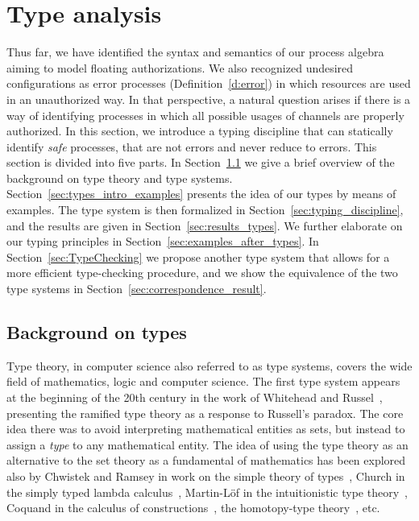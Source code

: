 
\section{Type analysis}\label{sec:Types}

Thus far, we have identified the syntax and semantics of our process algebra aiming to model floating authorizations. We also recognized undesired configurations as error processes (Definition~\ref{d:error})  in which resources are used in an unauthorized way. In that perspective, a natural question arises if there is a way of identifying processes in which all possible usages of channels are properly authorized. 
In this section, we introduce a typing discipline that can statically identify \emph{safe} processes, that are not errors and never reduce to errors. 
This section is divided into five parts. In Section~\ref{sec:types_background} we give a brief overview of the background on type theory and type systems. Section~\ref{sec:types_intro_examples} presents the idea of our types by means of examples. The type system is then formalized in Section~\ref{sec:typing_discipline}, and the results are given in Section~\ref{sec:results_types}. We further elaborate on our typing principles in Section~\ref{sec:examples_after_types}. In Section~\ref{sec:TypeChecking} we propose another type system that allows for a more efficient type-checking procedure, and we show the equivalence of the two type systems in Section~\ref{sec:correspondence_result}.

\subsection{Background on types}\label{sec:types_background}

Type theory, in computer science also referred to as type systems, covers the wide field of mathematics, logic and computer science. The first type system appears at the beginning of the 20th century in the work of Whitehead and Russel~\cite{WhiteheadRussell1910}, presenting the ramified type theory as a response to Russell's paradox. The core idea there was to avoid interpreting mathematical entities as sets, but instead to assign a \emph{type} to any mathematical entity. The idea of using the type theory as an alternative to the set theory as a fundamental of mathematics has been explored also by Chwistek and Ramsey in work on the simple theory of types~\cite{chwistek1925theory, ramsey1926foundations}, Church in the simply typed lambda calculus~\cite{Church40}, Martin-L\" of in the intuitionistic type theory~\cite{MartinLof84}, Coquand in the calculus of constructions~\cite{DBLP:journals/iandc/CoquandH88}, the homotopy-type theory~\cite{hottbook}, etc. 
 
